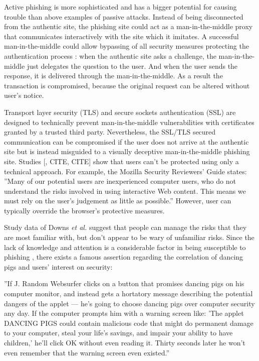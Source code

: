 \documentclass{tktltiki}
\begin{document}
    Active phishing is more sophisticated and has a bigger potential for causing trouble than above examples of passive attacks. Instead of being disconnected from the authentic site, the phishing site could act as a man-in-the-middle proxy that communicates interactively with the site which it imitates. A successful man-in-the-middle could allow bypassing of all security measures protecting the authentication process \cite{beamauth_2factor_2007, schneier_2factor_2005, why_phishing_works_06}: when the authentic site asks a challenge, the man-in-the-middle just delegates the question to the user. And when the user sends the response, it is delivered through the man-in-the-middle. As a result the transaction is compromised, because the original request can be altered without user's notice.

    Transport layer security (TLS) and secure sockets authentication (SSL) are designed to technically prevent man-in-the-middle vulnerabilities with certificates granted by a trusted third party. Nevertheless, the SSL/TLS secured communication can be compromised if the user does not arrive at the authentic site but is instead misguided to a visually deceptive man-in-the-middle phishing site. Studies \cite{why_phishing_works_06, suspectibility_to_phishing_2006}[, CITE, CITE] show that users can't be protected using only a technical approach. For example, the Mozilla Security Reviewers' Guide \cite{mozilla_security_guide_2010} states: ''Many of our potential users are inexperienced computer users, who do not understand the risks involved in using interactive Web content. This means we must rely on the user's judgement as little as possible.'' However, user can typically override the browser's protective measures.

    Study data of Downs \emph{et al.} \cite{suspectibility_to_phishing_2006} suggest that people can manage the risks that they are most familiar with, but don't appear to be wary of unfamiliar risks. Since the lack of knowledge and attention is a considerable factor in being susceptible to phishing \cite{why_phishing_works_06}, there exists a famous assertion regarding the correlation of dancing pigs and users' interest on security:

    ''If J. Random Websurfer clicks on a button that promises dancing pigs on his computer monitor, and instead gets a hortatory message describing the potential dangers of the applet — he's going to choose dancing pigs over computer security any day. If the computer prompts him with a warning screen like: 'The applet DANCING PIGS could contain malicious code that might do permanent damage to your computer, steal your life's savings, and impair your ability to have children,' he'll click OK without even reading it. Thirty seconds later he won't even remember that the warning screen even existed.''\cite{schneier_secrets_and_lies_2000}
\end{document}
